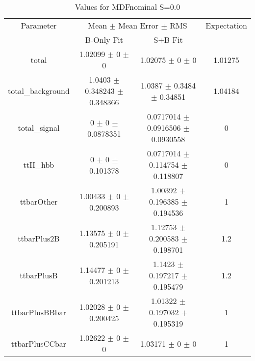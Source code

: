 \begin{table}
\centering
\caption{Values for MDFnominal S=0.0}
\begin{tabular}{cccc}
\toprule
Parameter & \multicolumn{2}{c}{Mean $\pm$ Mean Error $\pm$ RMS} & Expectation\\
 & B-Only Fit & S+B Fit & \\
\midrule
total & \num{1.02099} $\pm$ \num{0} $\pm$ \num{0} & \num{1.02075} $\pm$ \num{0} $\pm$ \num{0} & \num{1.01275}\\
total\_background & \num{1.0403} $\pm$ \num{0.348243} $\pm$ \num{0.348366} & \num{1.0387} $\pm$ \num{0.3484} $\pm$ \num{0.34851} & \num{1.04184}\\
total\_signal & \num{0} $\pm$ \num{0} $\pm$ \num{0.0878351} & \num{0.0717014} $\pm$ \num{0.0916506} $\pm$ \num{0.0930558} & \num{0}\\
ttH\_hbb & \num{0} $\pm$ \num{0} $\pm$ \num{0.101378} & \num{0.0717014} $\pm$ \num{0.114754} $\pm$ \num{0.118807} & \num{0}\\
ttbarOther & \num{1.00433} $\pm$ \num{0} $\pm$ \num{0.200893} & \num{1.00392} $\pm$ \num{0.196385} $\pm$ \num{0.194536} & \num{1}\\
ttbarPlus2B & \num{1.13575} $\pm$ \num{0} $\pm$ \num{0.205191} & \num{1.12753} $\pm$ \num{0.200583} $\pm$ \num{0.198701} & \num{1.2}\\
ttbarPlusB & \num{1.14477} $\pm$ \num{0} $\pm$ \num{0.201213} & \num{1.1423} $\pm$ \num{0.197217} $\pm$ \num{0.195479} & \num{1.2}\\
ttbarPlusBBbar & \num{1.02028} $\pm$ \num{0} $\pm$ \num{0.200425} & \num{1.01322} $\pm$ \num{0.197032} $\pm$ \num{0.195319} & \num{1}\\
ttbarPlusCCbar & \num{1.02622} $\pm$ \num{0} $\pm$ \num{0} & \num{1.03171} $\pm$ \num{0} $\pm$ \num{0} & \num{1}\\
\bottomrule
\end{tabular}
\end{table}